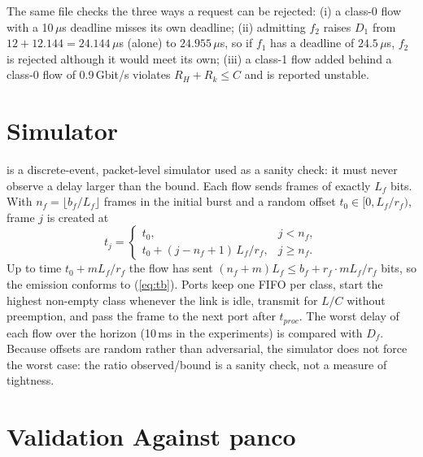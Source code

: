 \documentclass[9pt,a4paper,twocolumn,twoside]{tau-class/tau}
\providecommand{\eqref}[1]{(\ref{#1})}
\begin{document}
    The same file checks the three ways a request can be rejected: (i) a class-0 flow with a 10\,$\mu$s deadline misses its own deadline; (ii) admitting $f_2$ raises $D_1$ from $12 + 12.144 = 24.144\,\mu$s (alone) to $24.955\,\mu$s, so if $f_1$ has a deadline of $24.5\,\mu$s, $f_2$ is rejected although it would meet its own; (iii) a class-1 flow added behind a class-0 flow of 0.9\,Gbit/s violates $R_H + R_k \le C$ and is reported unstable.


\section{Simulator}
\label{sec:sim}

     is a discrete-event, packet-level simulator used as a sanity check: it must never observe a delay larger than the bound. Each flow sends frames of exactly $L_f$ bits. With $n_f = \lfloor b_f / L_f \rfloor$ frames in the initial burst and a random offset $t_0 \in [0, L_f/r_f)$, frame $j$ is created at
    \begin{equation}\label{eq:emit}
        t_j = \left\{ \begin{array}{ll} t_0, & j < n_f,\\ t_0 + (j - n_f + 1)\, L_f / r_f, & j \ge n_f. \end{array} \right.
    \end{equation}
    Up to time $t_0 + m L_f / r_f$ the flow has sent $(n_f + m) L_f \le b_f + r_f \cdot m L_f/r_f$ bits, so the emission conforms to \eqref{eq:tb}. Ports keep one FIFO per class, start the highest non-empty class whenever the link is idle, transmit for $L/C$ without preemption, and pass the frame to the next port after $t_{proc}$. The worst delay of each flow over the horizon (10\,ms in the experiments) is compared with $D_f$. Because offsets are random rather than adversarial, the simulator does not force the worst case: the ratio observed/bound is a sanity check, not a measure of tightness.


\section{Validation Against panco}
\end{document}
